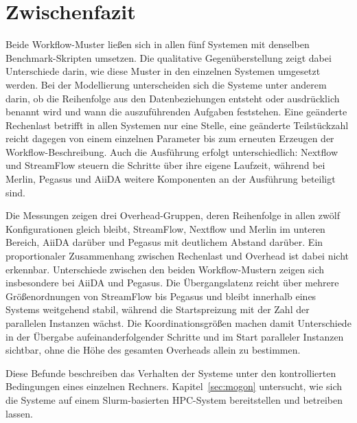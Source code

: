 \section{Zwischenfazit}
\label{sec:lokal:zwischenfazit}

Beide Workflow-Muster ließen sich in allen fünf Systemen mit
denselben Benchmark-Skripten umsetzen. Die qualitative
Gegenüberstellung zeigt dabei Unterschiede darin, wie diese Muster
in den einzelnen Systemen umgesetzt werden. Bei der Modellierung
unterscheiden sich die Systeme unter anderem darin, ob die
Reihenfolge aus den Datenbeziehungen entsteht oder ausdrücklich
benannt wird und wann die auszuführenden Aufgaben feststehen. Eine
geänderte Rechenlast betrifft in allen Systemen nur eine Stelle,
eine geänderte Teilstückzahl reicht dagegen von einem einzelnen
Parameter bis zum erneuten Erzeugen der Workflow-Beschreibung.
Auch die Ausführung erfolgt unterschiedlich: Nextflow und
StreamFlow steuern die Schritte über ihre eigene Laufzeit, während
bei Merlin, Pegasus und AiiDA weitere Komponenten an der Ausführung
beteiligt sind.

Die Messungen zeigen drei Overhead-Gruppen, deren Reihenfolge in
allen zwölf Konfigurationen gleich bleibt, StreamFlow, Nextflow und
Merlin im unteren Bereich, AiiDA darüber und Pegasus mit deutlichem
Abstand darüber. Ein proportionaler Zusammenhang zwischen
Rechenlast und Overhead ist dabei nicht erkennbar. Unterschiede
zwischen den beiden Workflow-Mustern zeigen sich insbesondere bei
AiiDA und Pegasus. Die Übergangslatenz reicht über mehrere
Größenordnungen von StreamFlow bis Pegasus und bleibt innerhalb
eines Systems weitgehend stabil, während die Startspreizung mit der
Zahl der parallelen Instanzen wächst. Die Koordinationsgrößen
machen damit Unterschiede in der Übergabe aufeinanderfolgender
Schritte und im Start paralleler Instanzen sichtbar, ohne die Höhe
des gesamten Overheads allein zu bestimmen.

Diese Befunde beschreiben das Verhalten der Systeme unter den
kontrollierten Bedingungen eines einzelnen Rechners.
Kapitel~\ref{sec:mogon} untersucht, wie sich die Systeme auf einem
Slurm-basierten HPC-System bereitstellen und betreiben lassen.